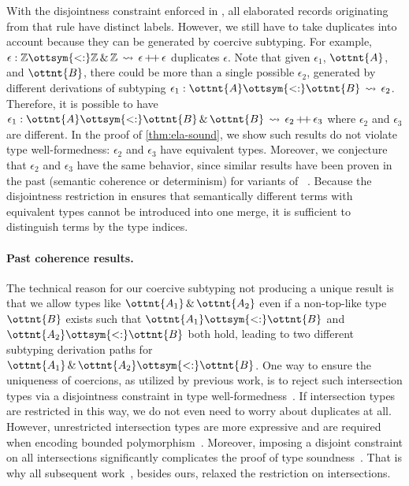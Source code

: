 With the disjointness constraint enforced in , all elaborated
records originating from that rule have distinct labels. However, we still have
to take duplicates into account because they can be generated by coercive
subtyping. For example, $\epsilon  :   \mathbb{Z}   \ottsym{<:}   \mathbb{Z}   \, {\&} \,   \mathbb{Z}   \,\rightsquigarrow\,  \epsilon  \,{+}\!{+}\,  \epsilon$ duplicates $\epsilon$.
Note that given $\epsilon_{{\mathrm{1}}}$, $\ottnt{A}$, and $\ottnt{B}$, there could be more than a
single possible $\epsilon_{{\mathrm{2}}}$, generated by different derivations of subtyping
$\epsilon_{{\mathrm{1}}}  :  \ottnt{A}  \ottsym{<:}  \ottnt{B}  \,\rightsquigarrow\,  \epsilon_{{\mathrm{2}}}$. Therefore, it is possible to have
$\epsilon_{{\mathrm{1}}}  :  \ottnt{A}  \ottsym{<:}  \ottnt{B}  \, {\&} \,  \ottnt{B}  \,\rightsquigarrow\,  \epsilon_{{\mathrm{2}}}  \,{+}\!{+}\,  \epsilon_{{\mathrm{3}}}$ where $\epsilon_{{\mathrm{2}}}$ and $\epsilon_{{\mathrm{3}}}$ are different. In the proof
of \autoref{thm:ela-sound}, we show such results do not violate type
well-formedness: $\epsilon_{{\mathrm{2}}}$ and $\epsilon_{{\mathrm{3}}}$ have equivalent types. Moreover, we
conjecture that $\epsilon_{{\mathrm{2}}}$ and $\epsilon_{{\mathrm{3}}}$ have the same behavior, since similar
results have been proven in the past (semantic coherence or determinism) for
variants of \lambdaiplus~\citep{bi2018essence,huang2021taming}. Because the
disjointness restriction in  ensures that semantically different
terms with equivalent types cannot be introduced into one merge, it is
sufficient to distinguish terms by the type indices.

\paragraph{Past coherence results.}
The technical reason for our coercive subtyping not producing a unique result is
that we allow types like $\ottnt{A_{{\mathrm{1}}}}  \, {\&} \,  \ottnt{A_{{\mathrm{2}}}}$ even if a non-top-like type $\ottnt{B}$ exists
such that $ \ottnt{A_{{\mathrm{1}}}}   \ottsym{<:}   \ottnt{B} $ and $ \ottnt{A_{{\mathrm{2}}}}   \ottsym{<:}   \ottnt{B} $ both hold, leading to two different
subtyping derivation paths for $ \ottnt{A_{{\mathrm{1}}}}  \, {\&} \,  \ottnt{A_{{\mathrm{2}}}}   \ottsym{<:}   \ottnt{B} $. One way to ensure the uniqueness
of coercions, as utilized by previous work, is to reject such intersection types
via a disjointness constraint in type
well-formedness~\citep{alpuim2017disjoint}. If intersection types are restricted
in this way, we do not even need to worry about duplicates at all. However,
unrestricted intersection types are more expressive and are required when
encoding bounded polymorphism~\citep{xie2020row}. Moreover, imposing a disjoint
constraint on all intersections significantly complicates the proof of type
soundness~\citep{alpuim2017disjoint}. That is why all subsequent
work~\citep{bi2018essence,bi2019distributive,huang2021taming,fan2022direct},
besides ours, relaxed the restriction on intersections.


